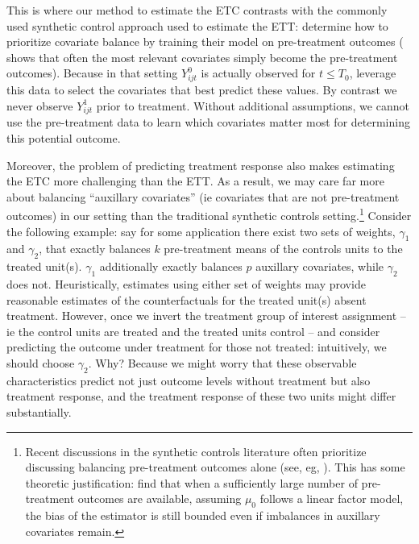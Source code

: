 \documentclass[12pt]{article}
\begin{document}
This is where our method to estimate the ETC contrasts with the commonly used synthetic control approach used to estimate the ETT: \cite{abadie2010synthetic} determine how to prioritize covariate balance by training their model on pre-treatment outcomes (\cite{kaul2015synthetic} shows that often the most relevant covariates simply become the pre-treatment outcomes). Because in that setting $Y^0_{ijt}$ is actually observed for $t \le T_0$, \cite{abadie2010synthetic} leverage this data to select the covariates that best predict these values. By contrast we never observe $Y^1_{ijt}$ prior to treatment. Without additional assumptions, we cannot use the pre-treatment data to learn which covariates matter most for determining this potential outcome.

Moreover, the problem of predicting treatment response also makes estimating the ETC more challenging than the ETT. As a result, we may care far more about balancing ``auxillary covariates'' (ie covariates that are not pre-treatment outcomes) in our setting than the traditional synthetic controls setting.\footnote{Recent discussions in the synthetic controls literature often prioritize discussing balancing pre-treatment outcomes alone (see, eg, \cite{doudchenko2016balancing}). This has some theoretic justification: \cite{botosaru2019role} find that when a sufficiently large number of pre-treatment outcomes are available, assuming $\mu_0$ follows a linear factor model, the bias of the estimator is still bounded even if imbalances in auxillary covariates remain.} Consider the following example: say for some application there exist two sets of weights, $\gamma_1$ and $\gamma_2$, that exactly balances $k$ pre-treatment means of the controls units to the treated unit(s). $\gamma_1$ additionally exactly balances $p$ auxillary covariates, while $\gamma_2$ does not. Heuristically, estimates using either set of weights may provide reasonable estimates of the counterfactuals for the treated unit(s) absent treatment. However, once we invert the treatment group of interest assignment -- ie the control units are treated and the treated units control -- and consider predicting the outcome under treatment for those not treated: intuitively, we should choose $\gamma_2$. Why? Because we might worry that these observable characteristics predict not just outcome levels without treatment but also treatment response, and the treatment response of these two units might differ substantially. 
\end{document}
